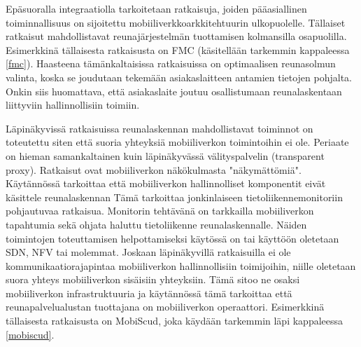 Epäsuoralla integraatiolla tarkoitetaan ratkaisuja, joiden pääasiallinen toiminnallisuus on sijoitettu mobiiliverkkoarkkitehtuurin ulkopuolelle. 
Tällaiset ratkaisut mahdollistavat reunajärjestelmän tuottamisen kolmansilla osapuolilla. Esimerkkinä tällaisesta ratkaisusta on FMC (käsitellään tarkemmin kappaleessa \ref{fmc}). Haasteena tämänkaltaisissa ratkaisuissa on optimaalisen reunasolmun valinta, koska se joudutaan tekemään asiakaslaitteen antamien tietojen pohjalta. Onkin siis huomattava, että asiakaslaite joutuu osallistumaan reunalaskentaan liittyviin hallinnollisiin toimiin.

Läpinäkyvissä ratkaisuissa reunalaskennan mahdollistavat toiminnot on toteutettu siten että suoria yhteyksiä mobiiliverkon toimintoihin ei ole. 
Periaate on hieman samankaltainen kuin läpinäkyvässä välityspalvelin (transparent proxy).
Ratkaisut ovat mobiiliverkon näkökulmasta "näkymättömiä".
Käytännössä tarkoittaa että mobiiliverkon hallinnolliset komponentit eivät käsittele reunalaskennan 
Tämä tarkoittaa jonkinlaiseen tietoliikennemonitoriin pohjautuvaa ratkaisua. 
Monitorin tehtävänä on tarkkailla mobiiliverkon tapahtumia sekä ohjata haluttu tietoliikenne reunalaskennalle.
Näiden toimintojen toteuttamisen helpottamiseksi käytössä on tai käyttöön oletetaan SDN, NFV tai molemmat.
Joskaan läpinäkyvillä ratkaisuilla ei ole kommunikaatiorajapintaa mobiiliverkon hallinnollisiin toimijoihin, niille oletetaan suora yhteys mobiiliverkon sisäisiin yhteyksiin. Tämä sitoo ne osaksi mobiiliverkon infrastruktuuria ja käytännössä tämä tarkoittaa että reunapalvelualustan tuottajana on mobiiliverkon operaattori. 
Esimerkkinä tällaisesta ratkaisusta on MobiScud, joka käydään tarkemmin läpi kappaleessa \ref{mobiscud}. 
